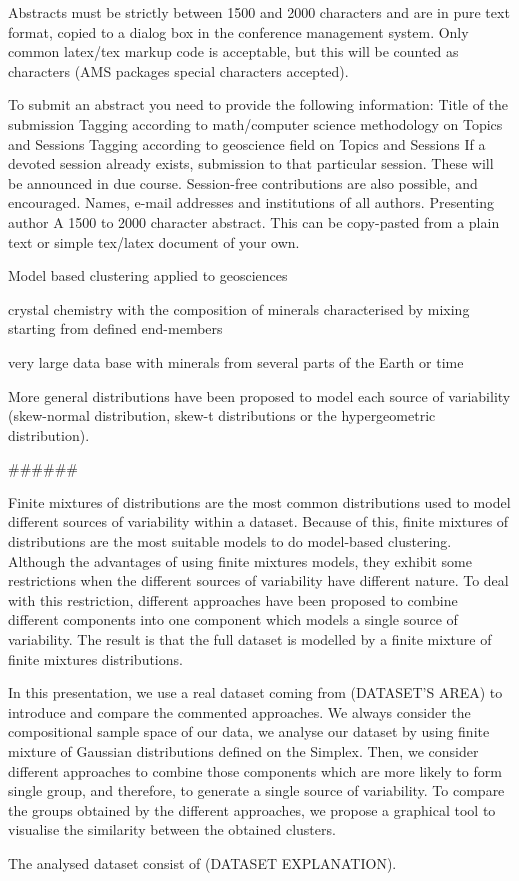 Abstracts must be strictly between 1500 and 2000 characters and are in pure text format, copied to a dialog box in the conference management system. Only common latex/tex markup code is acceptable, but this will be counted as characters (AMS packages special characters accepted).

To submit an abstract you need to provide the following information:
Title of the submission
Tagging according to math/computer science methodology on Topics and Sessions
Tagging according to geoscience field on Topics and Sessions
If a devoted session already exists, submission to that particular session. These will be announced in due course. Session-free contributions are also possible, and encouraged.
Names, e-mail addresses and institutions of all authors.
Presenting author
A 1500 to 2000 character abstract. This can be copy-pasted from a plain text or simple tex/latex document of your own.


Model based clustering applied to geosciences

 crystal chemistry with the composition of minerals characterised by mixing starting from defined end-members

very large data base with minerals from several parts of the Earth or time

More general distributions have been proposed to model each source of variability (skew-normal distribution, skew-t distributions or the hypergeometric distribution).

######

Finite mixtures of distributions are the most common distributions used to model different sources of variability within a dataset. Because of this, finite mixtures of distributions are the most suitable models to do model-based clustering. Although the advantages of using finite mixtures models, they exhibit some restrictions when the different sources of variability have different nature. To deal with this restriction, different approaches have been proposed to combine different components into one component which models a single source of variability. The result is that the full dataset is modelled by a finite mixture of finite mixtures distributions.

In this presentation, we use a real dataset coming from (DATASET'S AREA) to introduce and compare the commented approaches. We always consider the compositional sample space of our data, we analyse our dataset by using finite mixture of Gaussian distributions defined on the Simplex. Then, we consider different approaches to combine those components which are more likely to form single group, and therefore, to generate a single source of variability. To compare the groups obtained by the different approaches, we propose a graphical tool to visualise the similarity between the obtained clusters.

The analysed dataset consist of (DATASET EXPLANATION).

